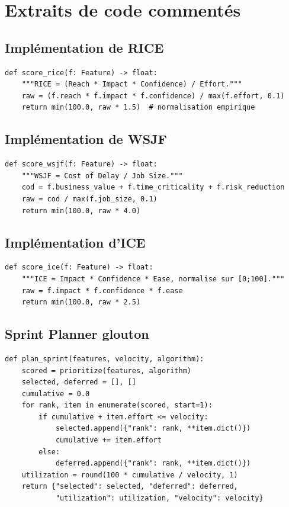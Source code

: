 \chapter{Extraits de code commentés}
\label{anx:code}

\section{Implémentation de RICE}
\begin{lstlisting}[caption={Scoring RICE normalisé sur [0;100].}]
def score_rice(f: Feature) -> float:
    """RICE = (Reach * Impact * Confidence) / Effort."""
    raw = (f.reach * f.impact * f.confidence) / max(f.effort, 0.1)
    return min(100.0, raw * 1.5)  # normalisation empirique
\end{lstlisting}

\section{Implémentation de WSJF}
\begin{lstlisting}[caption={Scoring WSJF (SAFe).}]
def score_wsjf(f: Feature) -> float:
    """WSJF = Cost of Delay / Job Size."""
    cod = f.business_value + f.time_criticality + f.risk_reduction
    raw = cod / max(f.job_size, 0.1)
    return min(100.0, raw * 4.0)
\end{lstlisting}

\section{Implémentation d'ICE}
\begin{lstlisting}[caption={Scoring ICE.}]
def score_ice(f: Feature) -> float:
    """ICE = Impact * Confidence * Ease, normalise sur [0;100]."""
    raw = f.impact * f.confidence * f.ease
    return min(100.0, raw * 2.5)
\end{lstlisting}

\section{Sprint Planner glouton}
\begin{lstlisting}[caption={Algorithme glouton du Sprint Planner.}]
def plan_sprint(features, velocity, algorithm):
    scored = prioritize(features, algorithm)
    selected, deferred = [], []
    cumulative = 0.0
    for rank, item in enumerate(scored, start=1):
        if cumulative + item.effort <= velocity:
            selected.append({"rank": rank, **item.dict()})
            cumulative += item.effort
        else:
            deferred.append({"rank": rank, **item.dict()})
    utilization = round(100 * cumulative / velocity, 1)
    return {"selected": selected, "deferred": deferred,
            "utilization": utilization, "velocity": velocity}
\end{lstlisting}

